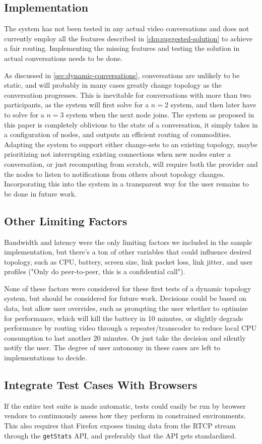 \subsection{Implementation}

The system has not been tested in any actual video conversations and does not currently employ all the features described in \autoref{chp:suggested-solution} to achieve a fair routing. Implementing the missing features and testing the solution in actual conversations needs to be done.

As discussed in \autoref{sec:dynamic-conversations}, conversations are unlikely to be static, and will probably in many cases greatly change topology as the conversation progresses. This is inevitable for conversations with more than two participants, as the system will first solve for a $n=2$ system, and then later have to solve for a $n=3$ system when the next node joins. The system as proposed in this paper is completely oblivious to the state of a conversation, it simply takes in a configuration of nodes, and outputs an efficient routing of commodities. Adapting the system to support either change-sets to an existing topology, maybe prioritizing not interrupting existing connections when new nodes enter a conversation, or just recomputing from scratch, will require both the provider and the nodes to listen to notifications from others about topology changes. Incorporating this into the system in a transparent way for the user remains to be done in future work.


\subsection{Other Limiting Factors}

Bandwidth and latency were the only limiting factors we included in the sample implementation, but there's a ton of other variables that could influence desired topology, such as CPU, battery, screen size, link packet loss, link jitter, and user profiles ("Only do peer-to-peer, this is a confidential call").

None of these factors were considered for these first tests of a dynamic topology system, but should be considered for future work. Decisions could be based on data, but allow user overrides, such as prompting the user whether to optimize for performance, which will kill the battery in 10 minutes, or slightly degrade performance by routing video through a repeater/transcoder to reduce local CPU consumption to last another 20 minutes. Or just take the decision and silently notify the user. The degree of user autonomy in these cases are left to implementations to decide.


\subsection{Integrate Test Cases With Browsers}

If the entire test suite is made automatic, tests could easily be run by browser vendors to continuously assess how they perform in constrained environments. This also requires that Firefox exposes timing data from the RTCP stream through the \texttt{getStats} API, and preferably that the API gets standardized.

